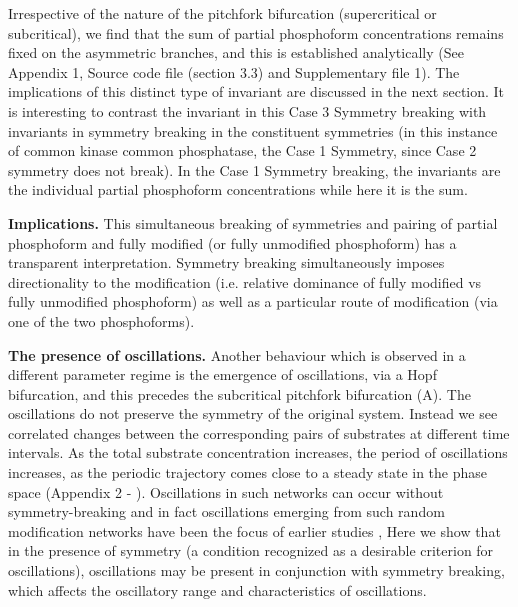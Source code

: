 \documentclass[9pt,lineno]{elife}
\begin{document}
Irrespective of the nature of the pitchfork bifurcation (supercritical or subcritical), we find that the sum of partial phosphoform concentrations remains fixed on the asymmetric branches, and this is established analytically (See Appendix 1, Source code file (section 3.3) and Supplementary file 1). The implications of this distinct type of invariant are discussed in the next section. It is interesting to contrast the invariant in this Case 3 Symmetry breaking with invariants in  symmetry breaking in the constituent symmetries (in this instance of common kinase common phosphatase, the Case 1 Symmetry, since Case 2 symmetry does not break).  In the Case 1 Symmetry breaking, the invariants are the individual partial phosphoform concentrations while here it is the sum.

{\bf Implications.} This simultaneous breaking of symmetries and pairing of partial phosphoform and fully modified (or fully  unmodified phosphoform) has a transparent interpretation. Symmetry breaking simultaneously imposes directionality to the modification (i.e. relative dominance of fully modified vs fully unmodified phosphoform) as well as a particular route of modification (via one of the two phosphoforms).

{\bf The presence of oscillations.} Another behaviour which is observed in a different parameter regime is the emergence of oscillations, via a Hopf bifurcation, and this precedes the subcritical pitchfork bifurcation (A).
The oscillations do not preserve the symmetry of the original system. Instead we see correlated changes between the corresponding pairs of substrates at different time intervals.
As the total substrate concentration increases, the period of oscillations increases, as the periodic trajectory comes close to a steady state in the phase space (Appendix 2 - ).
Oscillations in such networks can occur without symmetry-breaking and in fact
oscillations emerging from such random modification networks have been the focus of earlier studies \cite{Jolley2012}, 
Here we show that in the presence of symmetry (a condition recognized as a desirable criterion for oscillations), oscillations may be present in conjunction with symmetry breaking, which affects the oscillatory range and characteristics of oscillations.
\end{document}
